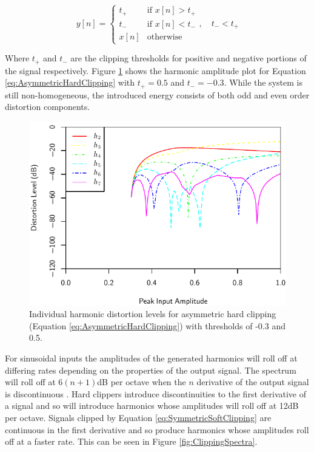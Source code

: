 			\begin{equation}
				y[n] = \begin{cases}
					t_{+} & \text{if $x[n] > t_{+}$} \\
					t_{-} & \text{if $x[n] < t_{-}$} \\
					x[n] & \text{otherwise}
				\end{cases}, \quad t_{-} < t_{+}
				\label{eq:AsymmetricHardClipping}
			\end{equation}

			Where $t_{+}$ and $t_{-}$ are the clipping thresholds for positive and negative portions of the
			signal respectively. Figure \ref{fig:AsymmetricHardClippingHarmonics} shows the harmonic amplitude
			plot for Equation \ref{eq:AsymmetricHardClipping} with $t_{+} = 0.5$ and $t_{-} = -0.3$. While the
			system is still non-homogeneous, the introduced energy consists of both odd and even order
			distortion components.

			\begin{figure}[h!]
				\centering
				\includegraphics{chapter5/Images/AsymmetricHardClippingHarmonics.pdf}
				\caption{Individual harmonic distortion levels for asymmetric hard clipping (Equation
					 \ref{eq:AsymmetricHardClipping}) with thresholds of -0.3 and 0.5.}
				\label{fig:AsymmetricHardClippingHarmonics}
			\end{figure}

			For sinusoidal inputs the amplitudes of the generated harmonics will roll off at differing rates
			depending on the properties of the output signal. The spectrum will roll off at $6(n+1)$dB per
			octave when the $n$ derivative of the output signal is discontinuous
			\citep{kraght2000aliasing}.  Hard clippers introduce discontinuities to the first derivative of a
			signal and so will introduce harmonics whose amplitudes will roll off at 12dB per octave. Signals
			clipped by Equation \ref{eq:SymmetricSoftClipping} are continuous in the first derivative and so
			produce harmonics whose amplitudes roll off at a faster rate. This can be seen in Figure
			\ref{fig:ClippingSpectra}.

